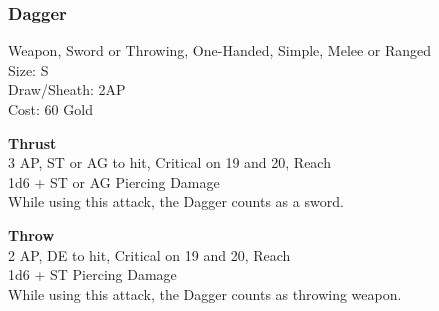 \subsubsection{Dagger}\label{weapon:dagger}
Weapon, Sword or Throwing, One-Handed, Simple, Melee or Ranged\\
Size: S\\
Draw/Sheath: 2AP\\
Cost: 60 Gold

\textbf{Thrust} \\
3 AP, ST or AG to hit, Critical on 19 and 20,  Reach\\
1d6 + \texttimes ST or AG Piercing Damage\\
While using this attack, the Dagger counts as a sword.

\textbf{Throw} \\
2 AP, DE to hit, Critical on 19 and 20,  Reach\\
1d6 + \texttimes ST Piercing Damage\\
While using this attack, the Dagger counts as throwing weapon.

